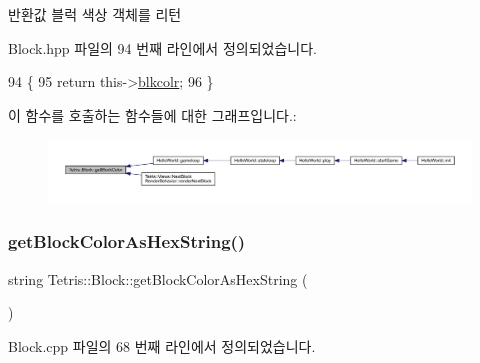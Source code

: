 \begin{DoxyReturn}{반환값}
블럭 색상 객체를 리턴 
\end{DoxyReturn}


Block.\+hpp 파일의 94 번째 라인에서 정의되었습니다.


\begin{DoxyCode}
94                                    \{
95             \textcolor{keywordflow}{return} this->\hyperlink{class_tetris_1_1_block_ab7cfb062eb49e791c94bac4a2e7a7ca9}{blkcolr};
96         \}
\end{DoxyCode}
이 함수를 호출하는 함수들에 대한 그래프입니다.\+:
\nopagebreak
\begin{figure}[H]
\begin{center}
\leavevmode
\includegraphics[width=350pt]{df/d05/class_tetris_1_1_block_ad61aea379870fbb3668d49e4c3c748ed_icgraph}
\end{center}
\end{figure}
\mbox{\label{class_tetris_1_1_block_a0adf3e3fbe9899115703913f18aaae6d}} 
\subsubsection{\texorpdfstring{get\+Block\+Color\+As\+Hex\+String()}{getBlockColorAsHexString()}\hspace{0.1cm}{\footnotesize\ttfamily [1/2]}}
{\footnotesize\ttfamily string Tetris\+::\+Block\+::get\+Block\+Color\+As\+Hex\+String (\begin{DoxyParamCaption}{ }\end{DoxyParamCaption})}



Block.\+cpp 파일의 68 번째 라인에서 정의되었습니다.


